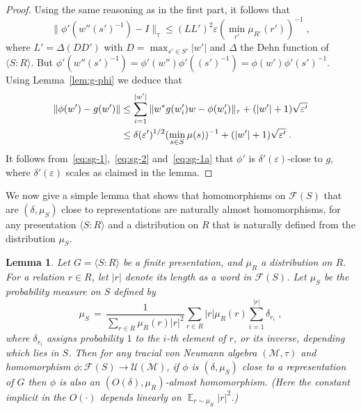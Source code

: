 \documentclass[11pt]{article}
\newtheorem{lemma}[theorem]{Lemma}
\theoremstyle{definition}
\DeclareMathOperator*{\Expectation}{\mathbb{E}}
\newcommand{\Es}[1]{\Expectation_{#1}}
\newcommand{\cM}{\ensuremath{\mathcal{M}}}
\newcommand{\eps}{\varepsilon}
\begin{document}
\begin{proof}
Using the same reasoning as in the first part, it follows that 
\begin{equation}\label{eq:sg-1}
   \|\phi'(w''(s')^{-1})-I\|_\tau \leq (LL')^2 \eps (\min_{r'}\mu_{R'}(r'))^{-1}\;,
\end{equation}
where $L'=\Delta(DD')$ with $D=\max_{s'\in S'}|w'|$ and $\Delta$ the Dehn function of $\langle S:R\rangle$.
 But $\phi'(w''(s')^{-1}) = \phi'(w'')\phi'((s')^{-1})=\phi(w')\phi'(s')^{-1}$. Using Lemma~\ref{lem:g-phi} we deduce that 
\begin{align}
 \|\phi(w')-g(w')\| &\leq \sum_{i=1}^{|w'|}  \| w^* g(w'_i)w -\phi(w'_i)\|_\tau + (|w'|+1)\sqrt{\eps'}\notag\\
 &\leq \delta(\eps')^{1/2}  (\min_{s\in S} \mu(s))^{-1} + (|w'|+1)\sqrt{\eps'}\;.\label{eq:sg-2}
\end{align}
It follows from~\eqref{eq:sg-1},~\eqref{eq:sg-2} and~\eqref{eq:sg-1a} that $\phi'$ is $\delta'(\eps)$-close to $g$, where $\delta'(\eps)$ scales as claimed in the lemma. 
\end{proof}

We now give a simple lemma that shows that homomorphisms on $\mathcal{F}(S)$ that are $(\delta,\mu_S)$ close to representations are naturally almost homomorphisms, for any presentation $\langle S:R\rangle$ and a distribution on $R$ that is naturally defined from the distribution $\mu_S$.


\begin{lemma}\label{lem:l1}
  Let $G=\langle S:R\rangle$ be a finite presentation, and $\mu_R$ a distribution on $R$. For a relation $r\in R$, let $|r|$ denote its length as a word in $\mathcal{F}(S)$. Let $\mu_S$ be the probability measure on $S$ defined by
  \begin{equation}\label{eq:mus}
     \mu_S \,=\, \frac{1}{\sum_{r\in R} \mu_R(r)|r|^2} \sum_{r\in R} |r|\mu_R(r) \sum_{i=1}^{|r|} \delta_{r_i}\;,
  \end{equation}
  where $\delta_{r_i}$ assigns probability $1$ to the $i$-th element of $r$, or its inverse, depending which lies in $S$. Then for any tracial von Neumann algebra $(\cM,\tau)$ and homomorphism $\phi:\mathcal{F}(S)\to \mathcal{U}(\cM)$, if $\phi$ is $(\delta,\mu_S)$ close to a representation of $G$ then $\phi$ is also an $(O(\delta),\mu_R)$-almost homomorphism. (Here the constant implicit in the $O(\cdot)$ depends linearly on $\Es{r\sim \mu_R}|r|^2$.)
  \end{lemma}
  
\end{document}

